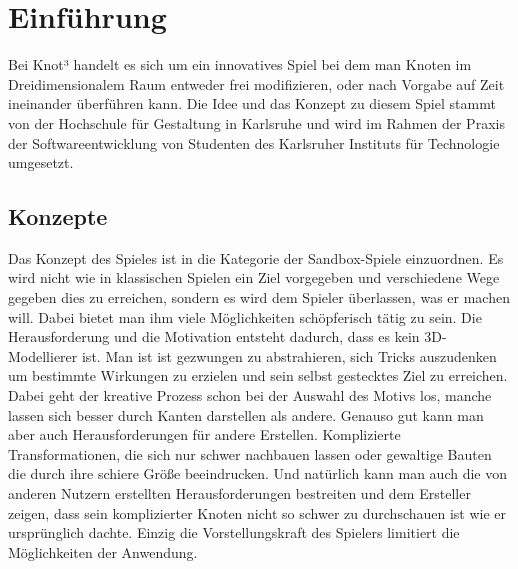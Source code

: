 %
%


\chapter{Einführung}
Bei Knot³ handelt es sich um ein innovatives Spiel bei dem man Knoten im Dreidimensionalem Raum entweder frei modifizieren, oder nach Vorgabe auf Zeit ineinander überführen kann.
Die Idee und das Konzept zu diesem Spiel stammt von der Hochschule für Gestaltung in Karlsruhe und wird im Rahmen der Praxis der Softwareentwicklung von Studenten des Karlsruher Instituts für Technologie umgesetzt.




\section{Konzepte}
Das Konzept des Spieles ist in die Kategorie der Sandbox-Spiele einzuordnen. Es wird nicht wie in klassischen Spielen ein Ziel vorgegeben und verschiedene Wege gegeben dies zu erreichen, sondern es wird dem Spieler überlassen, was er machen will. Dabei bietet man ihm viele Möglichkeiten schöpferisch tätig zu sein. Die Herausforderung und die Motivation entsteht dadurch, dass es kein 3D-Modellierer ist. Man ist ist gezwungen zu abstrahieren, sich Tricks auszudenken um bestimmte Wirkungen zu erzielen und sein selbst gestecktes Ziel zu erreichen. Dabei geht der kreative Prozess schon bei der Auswahl des Motivs los, manche lassen sich besser durch Kanten darstellen als andere.
Genauso gut kann man aber auch Herausforderungen für andere Erstellen. Komplizierte Transformationen, die sich nur schwer nachbauen lassen oder gewaltige Bauten die durch ihre schiere Größe beeindrucken. Und natürlich kann man auch die von anderen Nutzern erstellten Herausforderungen bestreiten und dem Ersteller zeigen, dass sein komplizierter Knoten nicht so schwer zu durchschauen ist wie er ursprünglich dachte.
Einzig die Vorstellungskraft des Spielers limitiert die Möglichkeiten der Anwendung.

